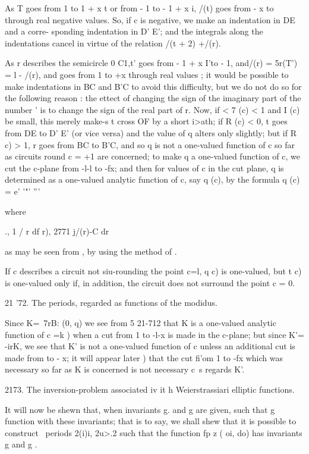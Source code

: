 As T goes from 1 to 1 + x t or from - 1 to - 1 + x i, /(t) goes from -
x to through real negative values. So, if c is negative, we make an
indentation in DE and a corre- sponding indentation in D' E'; and the
integrals along the indentations cancel in virtue of the relation /(t
+ 2) +/(r).

As r describes the semicircle 0 C1,t' goes from - 1 + x I'to - 1,
and/(r) = 5r(T') = l - /(r), and goes from 1 to +x through real values
; it would be possible to make indentations in BC and B'C to avoid
this difficulty, but we do not do so for the following reason : the
ettect of changing the sign of the imaginary part of the number ' is
to change the sign of the real part of r. Now, if < 7 (c) < 1 and I
(c) be small, this merely make-s t cross OF by a short i>ath; if R
(c) < 0, t goes from DE to D' E' (or vice versa) and the value of q
alters only slightly; but if R c) > 1, r goes from BC to B'C, and so
q is not a one-valued function of c so far as circuits round c = +1
are concerned; to make q a one-valued function of c, we cut the
c-plane from -l-l to -fx; and then for values of c in the cut plane,
q is determined as a one-valued analytic function of c, say q (c), by
the formula q (c) = e' '"' '''

where

., 1 / r df r), 2771 j/(r)-C dr

as may be seen from , by using the method of .

If c describes a circuit not siu-rounding the point c=l, q c) is
one-valued, but t c) is one-valued only if, in addition, the circuit
does not surround the point c = 0.

21 '72. The periods, regarded as functions of the modidus.

Since K=\ 7rB: (0, q) we see from 5 21-712 that K is a one-valued
analytic function of c =k ) when a cut from 1 to -l-x is made in the
c-plane; but since K'= -irK, we see that K' is not a one-valued
function of c unless an additional cut is made from to - x; it will
appear later ) that the cut fi'om 1 to -fx which was necessary
so far as K is concerned is not necessary c\ s regards K'.

2173. The inversion-problem associated iv it h Weierstrassiari
elliptic functions.

It will now be shewn that, when invariants g. and g are given, such
that g %
function with these invariants; that is to say, we shall shew that it
is possible to construct \ periods 2(i)i, 2u>.2 such that the function
fp z ( oi, do) has invariants g and g .

